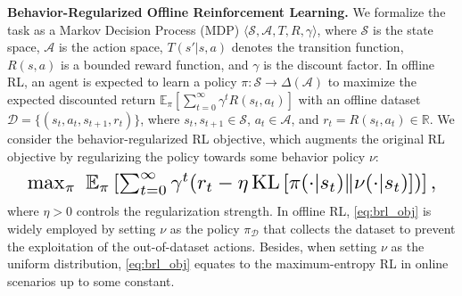 \textbf{Behavior-Regularized Offline Reinforcement Learning. }We formalize the task as a Markov Decision Process (MDP) $\langle\mathcal{S}, \mathcal{A}, T, R, \gamma\rangle$, where $\mathcal{S}$ is the state space, $\mathcal{A}$ is the action space, $T(s'|s, a)$ denotes the transition function, $R(s, a)$ is a bounded reward function, and $\gamma$ is the discount factor. In offline RL, an agent is expected to learn a policy $\pi: \mathcal{S}\rightarrow \Delta(\mathcal{A})$ to maximize the expected discounted return $\mathbb{E}_{\pi}[\sum_{t=0}^\infty\gamma^tR(s_t, a_t)]$ with an offline dataset $\mathcal{D}=\{(s_t,a_t,s_{t+1},r_t)\}$, where $s_t, s_{t+1}\in\mathcal{S}$, $a_t\in\mathcal{A}$, and $r_t=R(s_t,a_t)\in\mathbb{R}$. 
We consider the behavior-regularized RL objective, which augments the original RL objective by regularizing the policy towards some behavior policy $\nu$:
\begin{equation}\label{eq:brl_obj}
    \begin{aligned}
    \resizebox{0.95\linewidth}{!}{$
        \max_{\pi}\ \mathbb{E}_{\pi}\left[\sum_{t=0}^\infty\gamma^t(r_t-\eta\KL{\pi(\cdot|s_t)}{\nu(\cdot|s_t)})\right],
        $}
    \end{aligned}
\end{equation}
where 
$\eta>0$ controls the regularization strength. In offline RL, \eqref{eq:brl_obj} is widely employed by setting $\nu$ as the policy $\pi_{\mathcal{D}}$ that collects the dataset to prevent the exploitation of the out-of-dataset actions. Besides, when setting $\nu$ as the uniform distribution, \eqref{eq:brl_obj} equates to the maximum-entropy RL in online scenarios up to some constant. 

